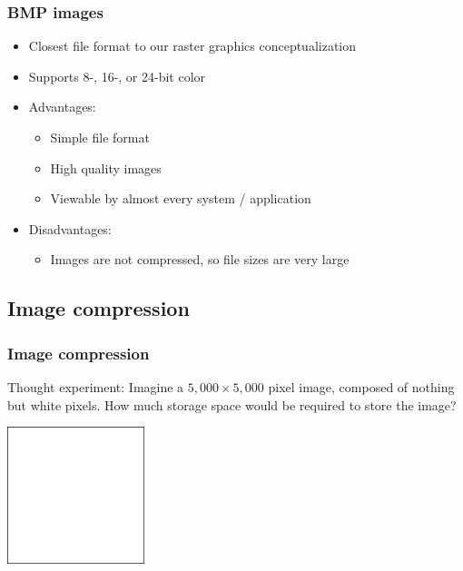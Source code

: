 \documentclass{beamer}
\begin{document}
\begin{frame}
	\frametitle{BMP images}

	\begin{itemize}

		\item Closest file format to our raster graphics conceptualization

		\item Supports 8-, 16-, or 24-bit color

		\item Advantages:

		\begin{itemize}

			\item Simple file format

			\item High quality images

			\item Viewable by almost every system / application

		\end{itemize}

		\item Disadvantages:

		\begin{itemize}

			\item Images are not compressed, so file sizes are very large

		\end{itemize}

	\end{itemize}

\end{frame}

\subsection{Image compression}

\begin{frame}
	\frametitle{Image compression}

	Thought experiment: Imagine a $5,000 \times 5,000$ pixel image, composed of nothing but white pixels. How much storage space would be required to store the image?

	\begin{center}
	\includegraphics[width=0.3\textwidth]{../../fig/01-white-square.jpg}
	\end{center}
\end{frame}
\end{document}
